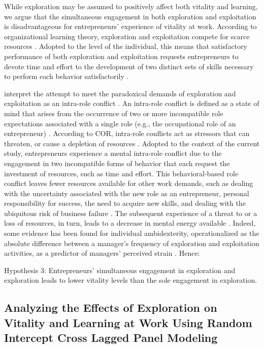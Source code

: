 \documentclass[man, 12pt, a4paper, noextraspace]{apa6}
\begin{document}
While exploration may be assumed to positively affect both vitality and learning, we argue that the simultaneous engagement in both exploration and exploitation is disadvantageous for entrepreneurs' experience of vitality at work. 
According to organizational learning theory, exploration and exploitation compete for scarce resources \parencite{March.1991}.
Adopted to the level of the individual, this means that satisfactory performance of both exploration and exploitation requests entrepreneurs to devote time and effort to the development of two distinct sets of skills necessary to perform each behavior satisfactorily \parencite{Papachroni2020}. \par 

\textcite{Hunter2017} interpret the attempt to meet the paradoxical demands of exploration and exploitation as an intra-role conflict \parencite{Hunter2017}. 
An intra-role conflict is defined as a state of mind that arises from the occurrence of two or more incompatible role expectations associated with a single role (e.g., the occupational role of an entrepreneur) \parencite{Grandey1999}. 
According to COR, intra-role conflicts act as stressors that can threaten, or cause a depletion of resources \parencite{Hobfoll.1989}.
Adopted to the context of the current study, entrepreneurs experience a mental intra-role conflict due to the engagement in two incompatible forms of behavior that each request the investment of resources, such as time and effort. 
This behavioral-based role conflict leaves fewer resources available for other work demands, such as dealing with the uncertainty associated with the new role as an entrepreneur, personal responsibility for success, the need to acquire new skills, and dealing with the ubiquitous risk of business failure \parencite{Byrne.2015, Wincent2009a}.
The subsequent experience of a threat to or a loss of resources, in turn, leads to a decrease in mental energy available \parencite{Hobfoll.1989, Hunter2017}.
Indeed, some evidence has been found for individual ambidexterity, operationalized as the absolute difference between a manager's frequency of exploration and exploitation activities, as a predictor of managers' perceived strain \parencite{Keller2015}.
Hence: \par
Hypothesis 3: Entrepreneurs' simultaneous engagement in exploration and exploration leads to lower vitality levels than the sole engagement in exploration. \par 

\subsection{Analyzing the Effects of Exploration on Vitality and Learning at Work Using Random Intercept Cross Lagged Panel Modeling}
\end{document}
